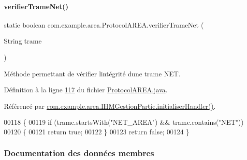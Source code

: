 \paragraph{\texorpdfstring{verifier\+Trame\+Net()}{verifierTrameNet()}}
{\footnotesize\ttfamily static boolean com.\+example.\+area.\+Protocol\+A\+R\+E\+A.\+verifier\+Trame\+Net (\begin{DoxyParamCaption}\item[{String}]{trame }\end{DoxyParamCaption})\hspace{0.3cm}{\ttfamily [static]}}



Méthode permettant de vérifier l\textquotesingle{}intégrité d\textquotesingle{}une trame N\+ET. 



Définition à la ligne \hyperlink{_protocol_a_r_e_a_8java_source_l00117}{117} du fichier \hyperlink{_protocol_a_r_e_a_8java_source}{Protocol\+A\+R\+E\+A.\+java}.



Référencé par \hyperlink{_i_h_m_gestion_partie_8java_source_l00291}{com.\+example.\+area.\+I\+H\+M\+Gestion\+Partie.\+initialiser\+Handler()}.


\begin{DoxyCode}
00118     \{
00119         \textcolor{keywordflow}{if} (trame.startsWith(\textcolor{stringliteral}{"NET\_AREA"}) && trame.contains(\textcolor{stringliteral}{"NET"}))
00120         \{
00121             \textcolor{keywordflow}{return} \textcolor{keyword}{true};
00122         \}
00123         \textcolor{keywordflow}{return} \textcolor{keyword}{false};
00124     \}
\end{DoxyCode}


\subsubsection{Documentation des données membres}
\mbox{\label{classcom_1_1example_1_1area_1_1_protocol_a_r_e_a_a5f26c701d9ee639249d7f11e0b87b72d}} 
